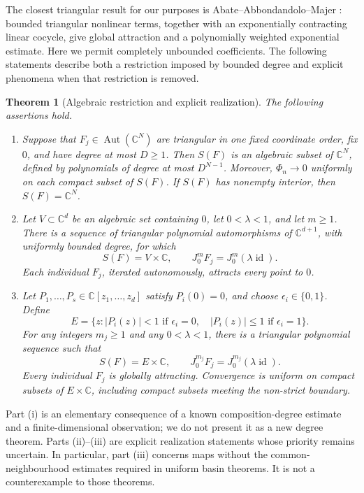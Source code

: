 \documentclass[12pt]{amsart}
\newtheorem{thm}{Theorem}[section]
\theoremstyle{definition}
\theoremstyle{remark}
\numberwithin{equation}{section}
\DeclareMathOperator{\Autop}{Aut}
\DeclareMathOperator{\id}{id}
\newcommand{\Aut}[1]{\Autop(#1)}
\newcommand{\C}{\mathbb{C}}
\begin{document}
The closest triangular result for our purposes is Abate--Abbondandolo--Majer \cite[Lemma 6.4]{AAM-en}: bounded triangular nonlinear terms, together with an exponentially contracting linear cocycle, give global attraction and a polynomially weighted exponential estimate. Here we permit completely unbounded coefficients. The following statements describe both a restriction imposed by bounded degree and explicit phenomena when that restriction is removed.

\begin{thm}[Algebraic restriction and explicit realization]\label{thm:main-en}
The following assertions hold.
\begin{enumerate}[label=\textup{(\roman*)},leftmargin=*]
\item Suppose that $F_j\in\Aut{\C^N}$ are triangular in one fixed coordinate order, fix $0$, and have degree at most $D\geq1$. Then $S(F)$ is an algebraic subset of $\C^N$, defined by polynomials of degree at most $D^{N-1}$. Moreover, $\Phi_n\to0$ uniformly on each compact subset of $S(F)$. If $S(F)$ has nonempty interior, then $S(F)=\C^N$.
\item Let $V\subset\C^d$ be an algebraic set containing $0$, let $0<\lambda<1$, and let $m\geq1$. There is a sequence of triangular polynomial automorphisms of $\C^{d+1}$, with uniformly bounded degree, for which
\[
S(F)=V\times\C,\qquad J_0^m F_j=J_0^m(\lambda\id).
\]
Each individual $F_j$, iterated autonomously, attracts every point to $0$.
\item Let $P_1,\ldots,P_s\in\C[z_1,\ldots,z_d]$ satisfy $P_i(0)=0$, and choose $\epsilon_i\in\{0,1\}$. Define
\begin{equation}\label{eq:target-en}
E=\{z: |P_i(z)|<1\text{ if }\epsilon_i=0,
\quad |P_i(z)|\leq1\text{ if }\epsilon_i=1\}.
\end{equation}
For any integers $m_j\geq1$ and any $0<\lambda<1$, there is a triangular polynomial sequence such that
\[
S(F)=E\times\C,\qquad J_0^{m_j}F_j=J_0^{m_j}(\lambda\id).
\]
Every individual $F_j$ is globally attracting. Convergence is uniform on compact subsets of $E\times\C$, including compact subsets meeting the non-strict boundary.
\end{enumerate}
\end{thm}

Part (i) is an elementary consequence of a known composition-degree estimate and a finite-dimensional observation; we do not present it as a new degree theorem. Parts (ii)--(iii) are explicit realization statements whose priority remains uncertain. In particular, part (iii) concerns maps without the common-neighbourhood estimates required in uniform basin theorems. It is not a counterexample to those theorems.
\end{document}
